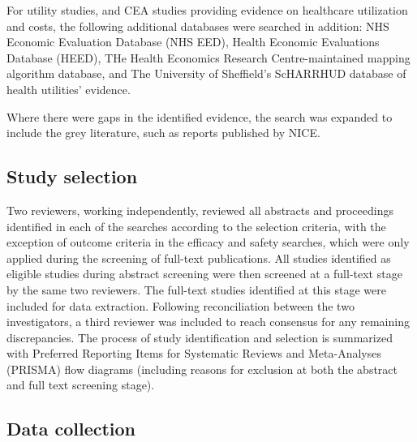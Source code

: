 \documentclass[11pt,final,fleqn]{article}\usepackage[]{graphicx}\usepackage[]{color}
\theoremstyle{plain}
\begin{document}
{\begin{appendices}
For utility studies, and CEA studies providing evidence on healthcare utilization and costs, the following additional databases were searched in addition: NHS Economic Evaluation Database (NHS EED), Health Economic Evaluations Database (HEED), THe Health Economics Research Centre-maintained mapping algorithm database, and The University of Sheffield's ScHARRHUD database of health utilities' evidence.

Where there were gaps in the identified evidence, the search was expanded to include the grey literature, such as reports published by NICE.

\subsection{Study selection}

Two reviewers, working independently, reviewed all abstracts and proceedings identified in each of the searches according to the selection criteria, with the exception of outcome criteria in the efficacy and safety searches, which were only applied during the screening of full-text publications. All studies identified as eligible studies during abstract screening were then screened at a full-text stage by the same two reviewers. The full-text studies identified at this stage were included for data extraction. Following reconciliation between the two investigators, a third reviewer was included to reach consensus for any remaining discrepancies. The process of study identification and selection is summarized with Preferred Reporting Items for Systematic Reviews and Meta-Analyses (PRISMA) flow diagrams (including reasons for exclusion at both the abstract and full text screening stage). 

\subsection{Data collection}


\end{appendices}}
\end{document}
